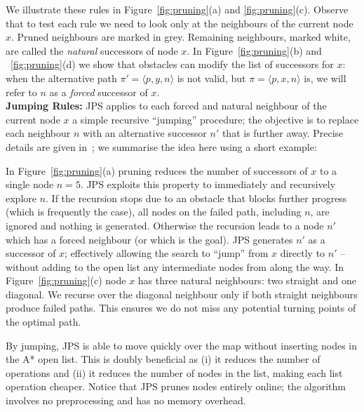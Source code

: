 We illustrate these rules in Figure~\ref{fig:pruning}(a) and \ref{fig:pruning}(c).
Observe that to test each rule we need to look only at
the neighbours of the current node $x$. 
Pruned neighbours are marked in grey. Remaining neighbours, marked
white, are called the \emph{natural} successors of node $x$.  
In Figure~\ref{fig:pruning}(b) and ~\ref{fig:pruning}(d) we show
that obstacles can modify the list of successors for $x$:
when the alternative path $\pi' = \langle p, y, n \rangle$ is
not valid, but $\pi = \langle p, x, n \rangle$ is, we will refer to $n$ as
a \emph{forced} successor of $x$.
\\ \newline
\textbf{Jumping Rules:}
JPS applies to each forced and natural neighbour of the current node $x$ a simple recursive
``jumping'' procedure; the objective is to replace each neighbour $n$ with an 
alternative successor $n'$ that is further away. Precise details are given
in~\cite{harabor11b}; we summarise the idea here using a short example:

\begin{example}
In Figure~\ref{fig:pruning}(a) pruning reduces the number
of successors of $x$ to a single node $n = 5$.
JPS exploits this property to immediately and recursively
explore $n$.
If the recursion stops due to an obstacle that blocks further progress
(which is frequently the case), all nodes on the failed path, including $n$, are ignored
and nothing is generated.
Otherwise the recursion leads to a node $n'$ which has a forced
neighbour (or which is the goal). JPS generates $n'$ as a successor of $x$; 
effectively allowing the search to ``jump'' from $x$ directly to $n'$ -- without adding
to the open list any intermediate nodes from along the way.
In Figure~\ref{fig:pruning}(c) node $x$ has three natural neighbours: two straight and one diagonal.
We recurse over the diagonal neighbour only if both straight neighbours produce
failed paths. This ensures we do not miss any potential turning points of the optimal path.
\end{example}

By jumping, JPS is able to move quickly over the map 
without inserting nodes in the A* open list.
This is doubly beneficial as (i) it reduces the number of operations 
and (ii) it reduces the number of nodes in the list, 
making each list operation cheaper.  
Notice that JPS prunes nodes entirely online; the algorithm involves no preprocessing and has no memory overhead.  

